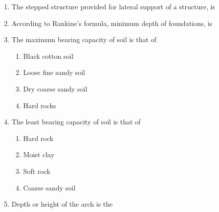 \documentclass[11pt,a4paper]{article}
\begin{document}
\begin{enumerate}
\begin{enumerate}[label=\Alph*.]
\end{enumerate}
\item{The stepped structure provided for lateral support of a structure, is}
\\
\item{According to Rankine's formula, minimum depth of foundations, is}
\\
\item{The maximum bearing capacity of soil is that of}
\begin{enumerate}[label=\Alph*.]
\item{Black cotton soil}
\item{Loose fine sandy soil}
\item{Dry coarse sandy soil}
\item{Hard rocks}
\end{enumerate}
\item{The least bearing capacity of soil is that of}
\begin{enumerate}[label=\Alph*.]
\item{Hard rock}
\item{Moist clay}
\item{Soft rock}
\item{Coarse sandy soil}
\end{enumerate}
\item{Depth or height of the arch is the}
\begin{enumerate}[label=\Alph*.]

\end{enumerate}
\end{enumerate}
\end{document}
